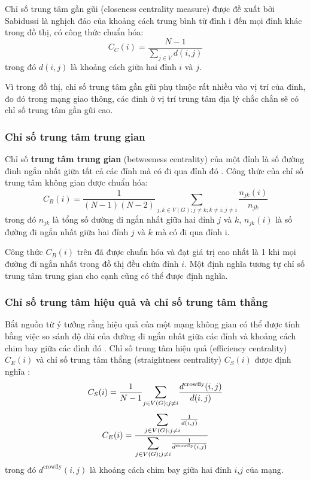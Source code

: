 \documentclass[14pt, oneside, a4paper, openany]{scrartcl}
\begin{document}
Chỉ số trung tâm gần gũi (closeness centrality measure) được đề xuất bởi Sabidussi \cite{centrali03} là nghịch đảo của khoảng cách trung bình từ đỉnh i đến mọi đỉnh khác trong đồ thị, có công thức chuẩn hóa:
\begin{equation}
C_C(i) = \frac{N-1}{\sum_{j \in V} d(i,j)}
\end{equation}
trong đó $d(i,j)$ là khoảng cách giữa hai đỉnh $i$ và $j$.

Vì trong đồ thị, chỉ số trung tâm gần gũi phụ thuộc rất nhiều vào vị trí của đỉnh, đo đó trong mạng giao thông, các đỉnh ở vị trí trung tâm địa lý chắc chắn sẽ có chỉ số trung tâm gần gũi cao.
\subsubsection{Chỉ số trung tâm trung gian}
Chỉ số \textbf{trung tâm trung gian}  (betweeness centrality) của một đỉnh là số đường đinh ngắn nhất giữa tất cả các đỉnh mà có đi qua đỉnh đó \cite{centrali02}. Công thức của chỉ số trung tâm không gian được chuẩn hóa:
\begin{equation}
	C_B(i) = \frac{1}{(N-1)(N-2)} \sum_{j,k \in V(G); j \neq k; k\neq i; j \neq i} \frac{n_{jk}(i)}{n_{jk}}
\end{equation}
trong đó $n_{jk}$ là tổng số đường đi ngắn nhất giữa hai đỉnh $j$ và $k$, $n_{jk}(i)$ là số đường đi ngắn nhất giữa hai đỉnh $j$ và $k$ mà có đi qua đỉnh i.

Công thức $C_B(i)$ trên đã được chuẩn hóa và đạt giá trị cao nhất là 1 khi mọi đường đi ngắn nhất trong đồ thị đều chứa đỉnh $i$. Một định nghĩa tương tự chỉ số trung tâm trung gian cho cạnh cũng có thể được định nghĩa.

\subsubsection{Chỉ số trung tâm hiệu quả và chỉ số trung tâm thẳng}
Bắt nguồn từ ý tưởng rằng hiệu quả của một mạng không gian có thể được tính bằng việc so sánh độ dài của đường đi ngắn nhất giữa các đỉnh và khoảng cách chim bay giữa các đỉnh đó \cite{efficiency01}. Chỉ số trung tâm hiệu quả (efficiency centrality) $C_E(i)$ và chỉ số trung tâm thẳng (straightness centrality) $C_S(i)$ được định nghĩa \cite{efficiency02}:
\begin{equation}
C_S(i) = \frac{1}{N-1} \mathlarger{\sum}_{j \in V(G); j \neq i} \frac{d^{\text{crowfly}}(i,j)}{d(i,j)}
\end{equation}
\begin{equation}
	C_E(i) = \frac{\mathlarger{\sum}_{j \in V(G); j \neq i}\frac{1}{d(i,j)}}{\mathlarger{\sum}_{j \in V(G); j \neq i}\frac{1}{d^{\text{crowfly}}(i,j)}}
\end{equation}
trong đó $d^{\text{crowfly}}(i,j)$ là khoảng cách chim bay giữa hai đỉnh $i$,$j$ của mạng.
\end{document}
